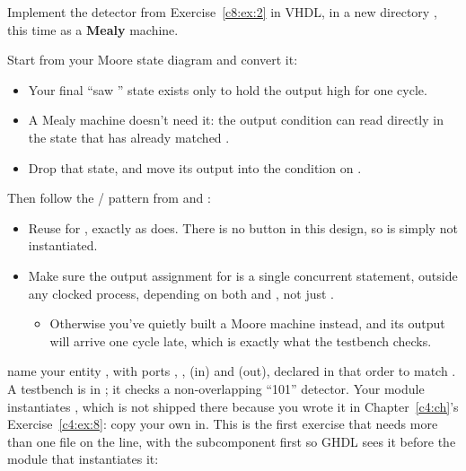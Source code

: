 \label{c8:ex:4}
Implement the  detector from Exercise~\ref{c8:ex:2} in VHDL, in a new directory
, this time as a \textbf{Mealy} machine.

Start from your Moore state diagram and convert it:
\begin{itemize}
  \item Your final ``saw '' state exists only to hold the output high for one cycle.
  \item A Mealy machine doesn't need it: the output condition can read  directly in the
    state that has already matched .
  \item Drop that state, and move its output into the condition on .
\end{itemize}
Then follow the  /  pattern from  and
:
\begin{itemize}
  \item Reuse  for , exactly as  does.
    There is no button in this design, so  is simply not instantiated.
  \item Make sure the output assignment for  is a single concurrent statement, outside any
    clocked process, depending on both  and , not just .
    \begin{itemize}
      \item Otherwise you've quietly built a Moore machine instead, and its output will arrive one
        cycle late, which is exactly what the testbench checks.
    \end{itemize}
\end{itemize}


\selfcheck name your entity , with ports , ,
 (in) and  (out), declared in that order to match . A
testbench is in ; it checks a non-overlapping ``101'' detector.
Your module instantiates , which is not shipped there because you wrote it in
Chapter~\ref{c4:ch}'s Exercise~\ref{c4:ex:8}: copy your own in. This is the first exercise that
needs more than one file on the  line, with the subcomponent first so GHDL sees it
before the module that instantiates it:

